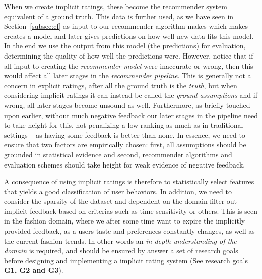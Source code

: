 When we create implicit ratings, these become the recommender system equivalent
of a ground truth. This data is further used, as we have seen in
Section~\ref{subsec:cf} as input to our recommender algorithm makes which makes
creates a model and later gives predictions on how well new data fits this
model. In the end we use the output from this model (the predictions) for
evaluation, determining the quality of how well the predictions were. However,
notice that if all input to creating the \textit{recommender model} were
inaccurate or wrong, then this would affect all later stages in the
\textit{recommender pipeline}. This is generally not a concern in explicit
ratings, after all the ground truth is the \textit{truth}, but when considering
implicit ratings it can instead be called the \textit{ground assumptions} and
if wrong, all later stages become unsound as well. Furthermore, as briefly
touched upon earlier, without much negative feedback our later stages in the
pipeline need to take height for this, not penalizing a low ranking as much as
in traditional settings -- as having some feedback is better than none. In
essence, we need to ensure that two factors are empirically chosen: first, all
assumptions should be grounded in statistical evidence and second, recommender
algorithms and evaluation schemes should take height for weak evidence of
negative feedback.

A consequence of using implicit ratings is therefore to statistically select
features that yields a good classification of user behaviors. In addition,
we need to consider the sparsity of the dataset and dependent on the domain
filter out implicit feedback based on criterias such as time sensitivity or
others. This is seen in the fashion domain, where we after some time want to
expire the implicitly provided feedback, as a users taste and preferences
constantly changes, as well as the current fashion trends. In other words an
\textit{in depth understanding of the domain} is required, and should be
ensured by answer a set of research goals before designing and implementing a
implicit rating system (See research goals \textbf{G1, G2 and G3}).
